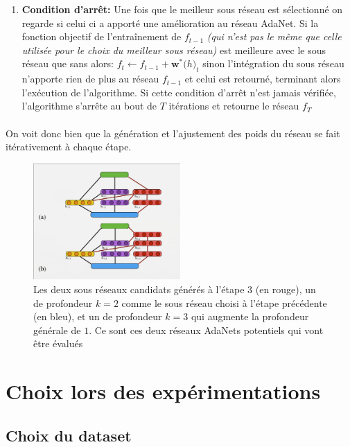 \documentclass[11 pt]{article}
\begin{document}
\begin{enumerate}
	\item \textbf{Condition d'arrêt: }Une fois que le meilleur sous réseau est sélectionn\'e on regarde si celui ci a apporté une amélioration au réseau AdaNet. Si la fonction objectif de l'entraînement de $f_{t-1}$ \emph{(qui n'est pas le même que celle utilisée pour le choix du meilleur sous réseau)} est meilleure avec le sous réseau que sans alors: $f_t \leftarrow f_{t-1}+\mathbf{w}^*\mathbf(h)_t$ sinon l'intégration du sous réseau n'apporte rien de plus au réseau $f_{t-1}$ et celui est retourn\'e, terminant alors l'exécution de l'algorithme. Si cette condition d'arrêt n'est jamais vérifiée, l'algorithme s'arrête au bout de $T$ itérations et retourne le réseau $f_T$
\end{enumerate}
\paragraph{}On voit donc bien que la génération et l'ajustement des poids du réseau se fait itérativement à chaque étape.\\ \bigskip
\begin{figure}[h]
	\centering
	\includegraphics[width=0.5\textwidth]{schema.png}
	\caption{Les deux sous réseaux candidats générés à l'étape $3$ (en rouge), un de profondeur $k=2$ comme le sous réseau choisi à l'étape précédente (en bleu), et un de profondeur $k=3$ qui augmente la profondeur générale de $1$. Ce sont ces deux réseaux AdaNets potentiels qui vont être évalués}
	\label{candidateModels}
\end{figure}

\section{Choix lors des expérimentations}
\subsection{Choix du dataset}
\end{document}
